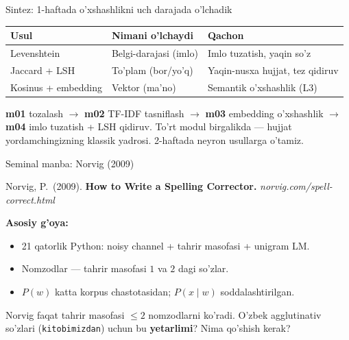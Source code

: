 \documentclass[aspectratio=169,11pt]{beamer}
\begin{document}
\begin{frame}{Sintez: 1-haftada o'xshashlikni uch darajada o'lchadik}
  \begin{center}\small
  \begin{tabular}{p{2.8cm}p{3.4cm}p{4.4cm}}
    \toprule
    \textbf{Usul} & \textbf{Nimani o'lchaydi} & \textbf{Qachon} \\
    \midrule
    Levenshtein & Belgi-darajasi (imlo) & Imlo tuzatish, yaqin so'z \\
    Jaccard + LSH & To'plam (bor/yo'q) & Yaqin-nusxa hujjat, tez qidiruv \\
    Kosinus + embedding & Vektor (ma'no) & Semantik o'xshashlik (L3) \\
    \bottomrule
  \end{tabular}
  \end{center}
  \vspace{4pt}
  \begin{tcolorbox}[okbox,title=1-hafta kapstone yoyi,top=2pt,bottom=2pt]
    \footnotesize
    \textbf{m01} tozalash $\to$ \textbf{m02} TF-IDF tasniflash $\to$
    \textbf{m03} embedding o'xshashlik $\to$ \textbf{m04} imlo tuzatish + LSH qidiruv.
    To'rt modul birgalikda --- hujjat yordamchingizning klassik yadrosi.
    2-haftada neyron usullarga o'tamiz.
  \end{tcolorbox}
\end{frame}

\begin{frame}{Seminal manba: Norvig (2009)}
  \begin{tcolorbox}[defbox,title=Manba]
    \small
    Norvig, P.\ (2009). \textbf{How to Write a Spelling Corrector.}
    \textit{norvig.com/spell-correct.html}
  \end{tcolorbox}
  \vspace{5pt}
  \textbf{Asosiy g'oya:}
  \begin{itemize}\small\setlength\itemsep{3pt}
    \item 21 qatorlik Python: noisy channel + tahrir masofasi + unigram LM.
    \item Nomzodlar --- tahrir masofasi $1$ va $2$ dagi so'zlar.
    \item $P(w)$ katta korpus chastotasidan; $P(x{\mid}w)$ soddalashtirilgan.
  \end{itemize}
  \vspace{5pt}
  \begin{tcolorbox}[warnbox,title=Muhokama savoli (P4 gacha o'ylang)]
    \small
    Norvig faqat tahrir masofasi $\le 2$ nomzodlarni ko'radi.
    O'zbek agglutinativ so'zlari (\texttt{kitobimizdan}) uchun bu
    \textbf{yetarlimi}? Nima qo'shish kerak?
  \end{tcolorbox}
\end{frame}
\end{document}
